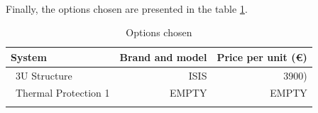 \paragraph{}Finally, the options chosen are presented in the table \ref{structurefinal}.

\begin{longtable}{| l | r | r | }
\hline
\rowcolor[gray]{0.80}	\textbf{System} &  \textbf{Brand and model}     & \textbf{Price per unit (\euro)}   \\
\hline
\endfirsthead

	   ~3U Structure & ISIS & 3900) \\
	   ~Thermal Protection 1 & EMPTY & EMPTY \\
	\hline

\caption{Options chosen}
\label{structurefinal}
\end{longtable}
